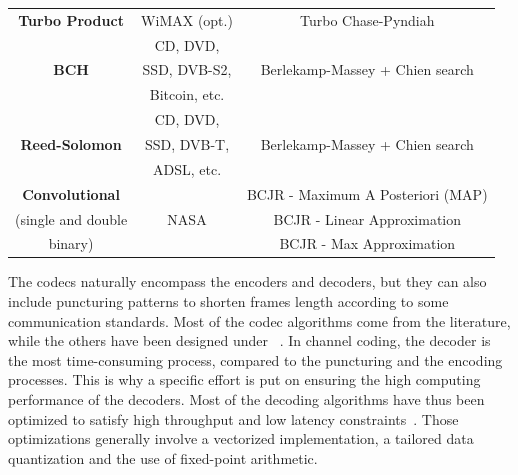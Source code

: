\begin{table}
\begin{tabular}{ c | c | c }
  \hline
  \multirow{2}{*}{\textbf{Turbo Product}}  & \multirow{2}{*}{WiMAX (opt.)}       & \multirow{2}{*}{Turbo Chase-Pyndiah}   \\
                                           &                                     &                                        \\
  \hline
  \multirow{3}{*}{\textbf{BCH}}            & CD, DVD,                            &                                        \\
                                           & SSD, DVB-S2,                        & Berlekamp-Massey + Chien search        \\
                                           & Bitcoin, etc.                       &                                        \\
  \hline
  \multirow{3}{*}{\textbf{Reed-Solomon}}   & CD, DVD,                            &                                        \\
                                           & SSD, DVB-T,                         & Berlekamp-Massey + Chien search        \\
                                           & ADSL, etc.                          &                                        \\
  \hline
  \multirow{1}{*}{\textbf{Convolutional}}  &                                     & BCJR - Maximum A Posteriori (MAP)      \\
  (single and double                       & NASA                                & BCJR - Linear Approximation            \\
  binary)                                  &                                     & BCJR - Max Approximation               \\
  \end{tabular}
\end{table}

The codecs naturally encompass the encoders and decoders, but they can also
include puncturing patterns to shorten frames length according to some
communication standards. Most of the codec algorithms come from the literature,
while the others have been designed under
\AFFECT~\cite{Tonnellier2016a,Tonnellier2016b,Tonnellier2017,Leonardon2019}.
In channel coding, the decoder is the most time-consuming process, compared to
the puncturing and the encoding processes. This is why a specific effort is put
on ensuring the high computing performance of the decoders. Most of the decoding
algorithms have thus been optimized to satisfy high throughput and low latency
constraints~\cite{LeGal2015a,Cassagne2015c,Cassagne2016a,Cassagne2016b}. Those
optimizations generally involve a vectorized implementation, a tailored data
quantization and the use of fixed-point arithmetic.

